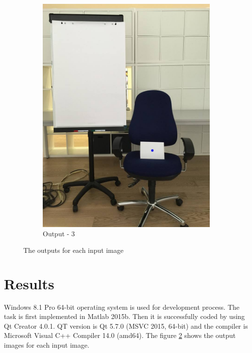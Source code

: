 \documentclass[paper=a4, fontsize=10pt]{scrartcl} %
\numberwithin{equation}{section} %
\numberwithin{figure}{section} %
\begin{document}
\begin{figure}[!ht]
\begin{subfigure}[b]{0.25\textwidth}
		\includegraphics[width=\textwidth]{output_03}
		\caption{Output - 3}
		\label{fig:output_03}
	\end{subfigure}
	\caption{The outputs for each input image}
	\label{fig:results}
\end{figure}


\section{Results}

Windows 8.1 Pro 64-bit operating system is used for development process. The task is first implemented in Matlab 2015b. Then it is successfully coded by using Qt Creator 4.0.1. QT version is Qt 5.7.0 (MSVC 2015, 64-bit) and the compiler is Microsoft Visual C++ Compiler 14.0 (amd64). The figure \ref{fig:results} shows the output images for each input image.
\end{document}
